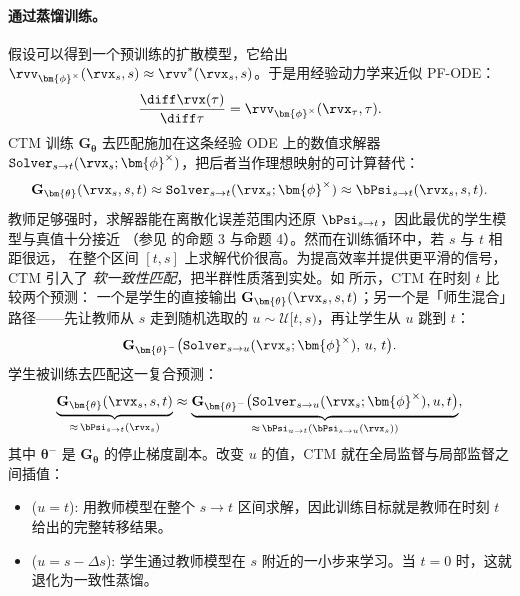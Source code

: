 \paragraph{通过蒸馏训练。}
假设可以得到一个预训练的扩散模型，它给出
$\rvv_{\bm{\phi}^\times}(\rvx_s, s) \approx \rvv^*(\rvx_s, s)$。于是用经验动力学来近似 PF-ODE：
\begin{align}
\frac{\diff \rvx(\tau)}{\diff \tau}
= \rvv_{\bm{\phi}^\times}(\rvx_\tau, \tau).
\end{align}
CTM 训练 $\mathbf{G}_{\bm{\theta}}$ 去匹配施加在这条经验 ODE 上的数值求解器
$\mathtt{Solver}_{s\to t}(\rvx_s;\bm{\phi}^\times)$，把后者当作理想映射的可计算替代：
\[
\mathbf{G}_{\bm{\theta}}(\rvx_s, s, t)
\approx \mathtt{Solver}_{s\to t}(\rvx_s;\bm{\phi}^\times)
\approx \bPsi_{s\to t}(\rvx_s, s, t).
\]
教师足够强时，求解器能在离散化误差范围内还原 $\bPsi_{s\to t}$，因此最优的学生模型与真值十分接近
（参见 \citep{kim2023consistency} 的命题 3 与命题 4）。然而在训练循环中，若 $s$ 与 $t$ 相距很远，
在整个区间 $[t,s]$ 上求解代价很高。为提高效率并提供更平滑的信号，CTM 引入了
\emph{软一致性匹配}，把半群性质落到实处。如  所示，CTM 在时刻 $t$ 比较两个预测：
一个是学生的直接输出 $\mathbf{G}_{\bm{\theta}}(\rvx_s, s, t)$；另一个是「师生混合」路径——先让教师从 $s$ 走到随机选取的
$u \sim \mathcal{U}[t,s)$，再让学生从 $u$ 跳到 $t$：
\[
\mathbf{G}_{\bm{\theta}^-} \big(\mathtt{Solver}_{s\to u}(\rvx_s;\bm{\phi}^\times),\, u,\, t\big).
\]
学生被训练去匹配这一复合预测：
\begin{align}\label{eq:soft}
\underbrace{\mathbf{G}_{\bm{\theta}}(\rvx_s, s, t)}_{\approx\, \bPsi_{s\to t}(\rvx_s)}
 \approx
\underbrace{\mathbf{G}_{\bm{\theta}^-} \big(\mathtt{Solver}_{s\to u}(\rvx_s;\bm{\phi}^\times), u, t\big)}_{\approx\, \bPsi_{u\to t}(\bPsi_{s\to u}(\rvx_s))},
\end{align}
其中 $\bm{\theta}^-$ 是 $\mathbf{G}_{\bm{\theta}}$ 的停止梯度副本。改变 $u$ 的值，CTM 就在全局监督与局部监督之间插值：
\begin{itemize}
    \item {} ($u=t$): 用教师模型在整个 $s\to t$ 区间求解，因此训练目标就是教师在时刻 $t$ 给出的完整转移结果。

    \item {} ($u=s-\Delta s$): 学生通过教师模型在 $s$ 附近的一小步来学习。当 $t=0$ 时，这就退化为一致性蒸馏。
\end{itemize}

